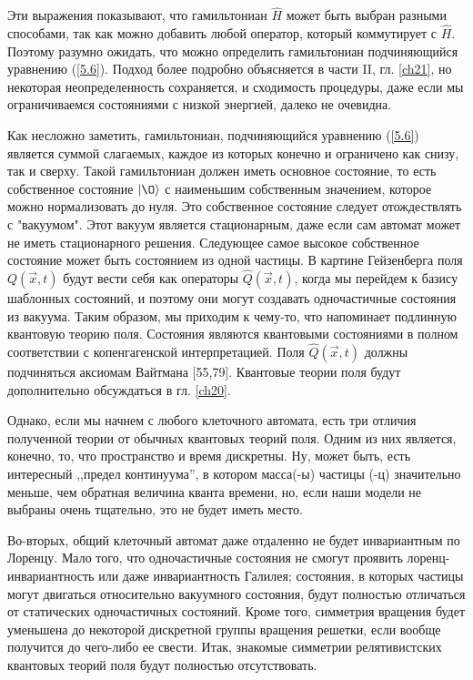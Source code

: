 \documentclass[main.tex]{subfiles}
\begin{document}
Эти выражения показывают, что гамильтониан $\hat H$ может быть выбран разными способами, так как можно добавить любой оператор, который коммутирует с  $\hat H$. Поэтому разумно ожидать, что можно определить гамильтониан подчиняющийся уравнению (\ref{5.6}). Подход более подробно объясняется в части II, гл. \ref{ch21}, но некоторая неопределенность сохраняется, и сходимость процедуры, даже если мы ограничиваемся состояниями с низкой энергией, далеко не очевидна.

Как несложно заметить, гамильтониан, подчиняющийся уравнению (\ref{5.6}) является суммой слагаемых, каждое из которых конечно и ограничено как снизу, так и сверху. Такой гамильтониан должен иметь основное состояние, то есть собственное состояние $|\O\rangle$ с наименьшим собственным значением, которое можно нормализовать до нуля. Это собственное состояние следует отождествлять с "вакуумом". Этот вакуум является стационарным, даже если сам автомат может не иметь стационарного решения. Следующее самое высокое собственное состояние может быть состоянием из одной частицы. В картине Гейзенберга поля $Q (\vec x, t)$ будут вести себя как операторы $\hat Q (\vec x, t)$, когда мы перейдем к базису шаблонных состояний, и поэтому они могут создавать одночастичные состояния из вакуума. Таким образом, мы приходим к чему-то, что напоминает подлинную квантовую теорию поля. Состояния являются квантовыми состояниями в полном соответствии с копенгагенской интерпретацией. Поля $\hat Q (\vec x, t)$ должны подчиняться аксиомам Вайтмана [55,79]. Квантовые теории поля будут дополнительно обсуждаться в гл. \ref{ch20}.

Однако, если мы начнем с любого клеточного автомата, есть три отличия полученной теории от обычных квантовых теорий поля. Одним из них является, конечно, то, что пространство и время дискретны. Ну, может быть, есть интересный ,,предел континуума'', в котором масса(-ы) частицы (-ц) значительно меньше, чем обратная величина кванта времени, но, если наши модели не выбраны очень тщательно, это не будет иметь место.

Во-вторых, общий клеточный автомат даже отдаленно не будет инвариантным по Лоренцу. Мало того, что одночастичные состояния не смогут проявить лоренц-инвариантность или даже инвариантность Галилея; состояния, в которых частицы могут двигаться относительно вакуумного состояния, будут полностью отличаться от статических одночастичных состояний. Кроме того, симметрия вращения будет уменьшена до некоторой дискретной группы вращения решетки, если вообще получится до чего-либо ее свести. Итак, знакомые симметрии релятивистских квантовых теорий поля будут полностью отсутствовать.
\end{document}
